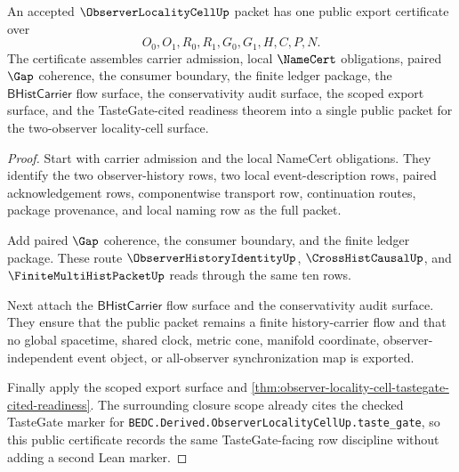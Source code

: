 \begin{theorem}
\label{thm:observer-locality-cell-public-export-certificate}
An accepted $\ObserverLocalityCellUp$ packet has one public export certificate over
$$
O_0,O_1,R_0,R_1,G_0,G_1,H,C,P,N.
$$
The certificate assembles carrier admission, local $\NameCert$ obligations, paired $\Gap$ coherence, the consumer boundary, the finite ledger package, the $\mathsf{BHistCarrier}$ flow surface, the conservativity audit surface, the scoped export surface, and the TasteGate-cited readiness theorem into a single public packet for the two-observer locality-cell surface.
\end{theorem}
\begin{proof}
Start with carrier admission and the local NameCert obligations. They identify the two observer-history rows, two local event-description rows, paired acknowledgement rows, componentwise transport row, continuation routes, package provenance, and local naming row as the full packet.

Add paired $\Gap$ coherence, the consumer boundary, and the finite ledger package. These route $\ObserverHistoryIdentityUp$, $\CrossHistCausalUp$, and $\FiniteMultiHistPacketUp$ reads through the same ten rows.

Next attach the $\mathsf{BHistCarrier}$ flow surface and the conservativity audit surface. They ensure that the public packet remains a finite history-carrier flow and that no global spacetime, shared clock, metric cone, manifold coordinate, observer-independent event object, or all-observer synchronization map is exported.

Finally apply the scoped export surface and \autoref{thm:observer-locality-cell-tastegate-cited-readiness}. The surrounding closure scope already cites the checked TasteGate marker for \texttt{BEDC.Derived.ObserverLocalityCellUp.taste\_gate}, so this public certificate records the same TasteGate-facing row discipline without adding a second Lean marker.
\end{proof}



